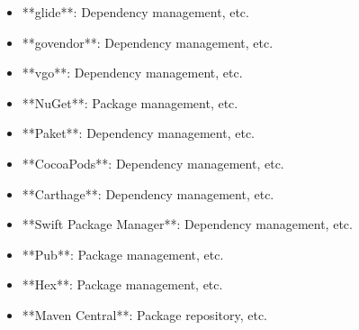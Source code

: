 \documentclass[11pt,a4paper]{article}
\begin{document}
\begin{itemize}
\item **glide**: Dependency management, etc.
\end{itemize}

\begin{itemize}
\item **govendor**: Dependency management, etc.
\end{itemize}

\begin{itemize}
\item **vgo**: Dependency management, etc.
\end{itemize}

\begin{itemize}
\item **NuGet**: Package management, etc.
\end{itemize}

\begin{itemize}
\item **Paket**: Dependency management, etc.
\end{itemize}

\begin{itemize}
\item **CocoaPods**: Dependency management, etc.
\end{itemize}

\begin{itemize}
\item **Carthage**: Dependency management, etc.
\end{itemize}

\begin{itemize}
\item **Swift Package Manager**: Dependency management, etc.
\end{itemize}

\begin{itemize}
\item **Pub**: Package management, etc.
\end{itemize}

\begin{itemize}
\item **Hex**: Package management, etc.
\end{itemize}

\begin{itemize}
\item **Maven Central**: Package repository, etc.
\end{itemize}
\end{document}
